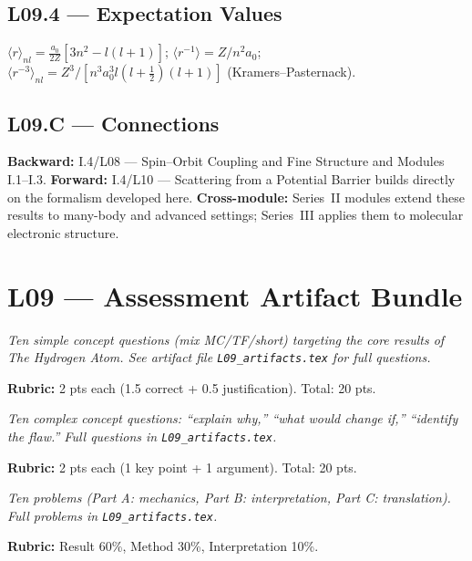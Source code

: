 \subsection*{L09.4 — Expectation Values}
$\langle r\rangle_{nl} = \frac{a_0}{2Z}[3n^2-l(l+1)]$;
$\langle r^{-1}\rangle = Z/n^2a_0$;
$\langle r^{-3}\rangle_{nl} = Z^3/[n^3a_0^3 l(l+\tfrac{1}{2})(l+1)]$ (Kramers–Pasternack).


\subsection*{L09.C — Connections}
\label{sec:L09.C}
\textbf{Backward:} I.4/L08 — Spin–Orbit Coupling and Fine Structure and Modules I.1–I.3.
\textbf{Forward:} I.4/L10 — Scattering from a Potential Barrier builds directly on the formalism developed here.
\textbf{Cross-module:} Series~II modules extend these results to many-body and
advanced settings; Series~III applies them to molecular electronic structure.

\newpage
\section*{L09 — Assessment Artifact Bundle}

\begin{tcolorbox}[ugconceptbox, title={SCQU · L09 · Tiers 1–3 · 15–20 min}]
\textit{Ten simple concept questions (mix MC/TF/short) targeting the core results
of The Hydrogen Atom. See artifact file \texttt{L09_artifacts.tex} for full questions.}

\textbf{Rubric:} 2 pts each (1.5 correct + 0.5 justification). Total: 20 pts.
\end{tcolorbox}

\begin{tcolorbox}[ugconceptbox, title={CCQU · L09 · Tiers 2–3 · 25–35 min}]
\textit{Ten complex concept questions: ``explain why,'' ``what would change if,''
``identify the flaw.'' Full questions in \texttt{L09_artifacts.tex}.}

\textbf{Rubric:} 2 pts each (1 key point + 1 argument). Total: 20 pts.
\end{tcolorbox}

\begin{tcolorbox}[ugprobbox, title={SPSU · L09 · Tiers 1–3 · 60–90 min}]
\textit{Ten problems (Part A: mechanics, Part B: interpretation, Part C: translation).
Full problems in \texttt{L09_artifacts.tex}.}

\textbf{Rubric:} Result 60\%, Method 30\%, Interpretation 10\%.
\end{tcolorbox}

